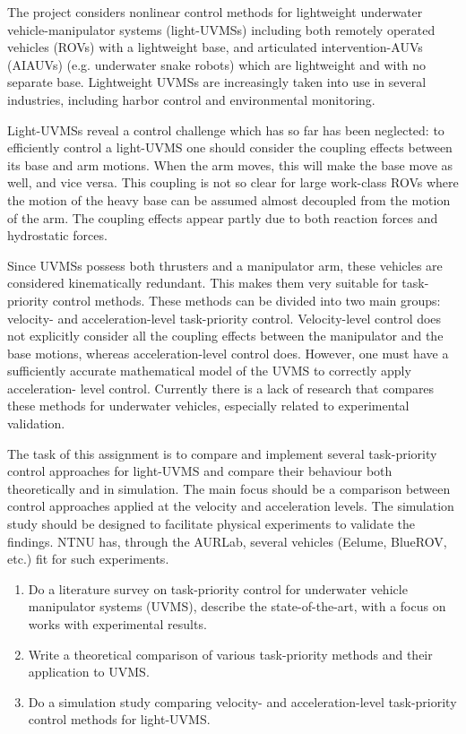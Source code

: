 The project considers nonlinear control methods for lightweight underwater vehicle-manipulator
systems (light-UVMSs) including both remotely operated vehicles (ROVs) with a lightweight
base, and articulated intervention-AUVs (AIAUVs) (e.g. underwater snake robots) which are
lightweight and with no separate base. Lightweight UVMSs are increasingly taken into use in
several industries, including harbor control and environmental monitoring.

Light-UVMSs reveal a control challenge which has so far has been neglected: to efficiently
control a light-UVMS one should consider the coupling effects between its base and arm
motions. When the arm moves, this will make the base move as well, and vice versa. This
coupling is not so clear for large work-class ROVs where the motion of the heavy base can be
assumed almost decoupled from the motion of the arm. The coupling effects appear partly due
to both reaction forces and hydrostatic forces.

Since UVMSs possess both thrusters and a manipulator arm, these vehicles are considered
kinematically redundant. This makes them very suitable for task-priority control methods. These
methods can be divided into two main groups: velocity- and acceleration-level task-priority
control. Velocity-level control does not explicitly consider all the coupling effects between the
manipulator and the base motions, whereas acceleration-level control does. However, one must
have a sufficiently accurate mathematical model of the UVMS to correctly apply acceleration-
level control. Currently there is a lack of research that compares these methods for underwater
vehicles, especially related to experimental validation.

The task of this assignment is to compare and implement several task-priority control
approaches for light-UVMS and compare their behaviour both theoretically and in simulation.
The main focus should be a comparison between control approaches applied at the velocity and
acceleration levels. The simulation study should be designed to facilitate physical experiments
to validate the findings. NTNU has, through
the AURLab, several vehicles (Eelume, BlueROV, etc.) fit for such experiments.
\newpage
\begin{enumerate}
\item Do a literature survey on task-priority control for underwater vehicle manipulator
systems (UVMS), describe the state-of-the-art, with a focus on works with experimental
results.
\item Write a theoretical comparison of various task-priority methods and their application to
UVMS.
\item Do a simulation study comparing velocity- and acceleration-level task-priority control
methods for light-UVMS.
\end{enumerate}
